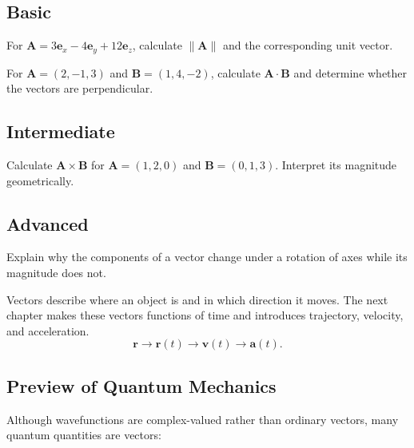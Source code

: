 \chapterexercisesheading
\subsection*{Basic}
\begin{chapterexercise}
For $\mathbf A=3\mathbf e_x-4\mathbf e_y+12\mathbf e_z$, calculate
$\lVert\mathbf A\rVert$ and the corresponding unit vector.
\end{chapterexercise}

\begin{chapterexercise}
For $\mathbf A=(2,-1,3)$ and $\mathbf B=(1,4,-2)$, calculate
$\mathbf A\cdot\mathbf B$ and determine whether the vectors are perpendicular.
\end{chapterexercise}

\subsection*{Intermediate}
\begin{chapterexercise}
Calculate $\mathbf A\times\mathbf B$ for
$\mathbf A=(1,2,0)$ and $\mathbf B=(0,1,3)$.
Interpret its magnitude geometrically.
\end{chapterexercise}

\subsection*{Advanced}
\begin{chapterexercise}
Explain why the components of a vector change under a rotation of axes while
its magnitude does not.
\end{chapterexercise}

\chapterlookaheadheading
\begin{lookingaheadbox}
Vectors describe where an object is and in which direction it moves.
The next chapter makes these vectors functions of time and introduces
trajectory, velocity, and acceleration.
\[
\mathbf r
\longrightarrow
\mathbf r(t)
\longrightarrow
\mathbf v(t)
\longrightarrow
\mathbf a(t).
\]
\end{lookingaheadbox}

\subsection{Preview of Quantum Mechanics}

Although wavefunctions are complex-valued rather than ordinary vectors,
many quantum quantities are vectors:

